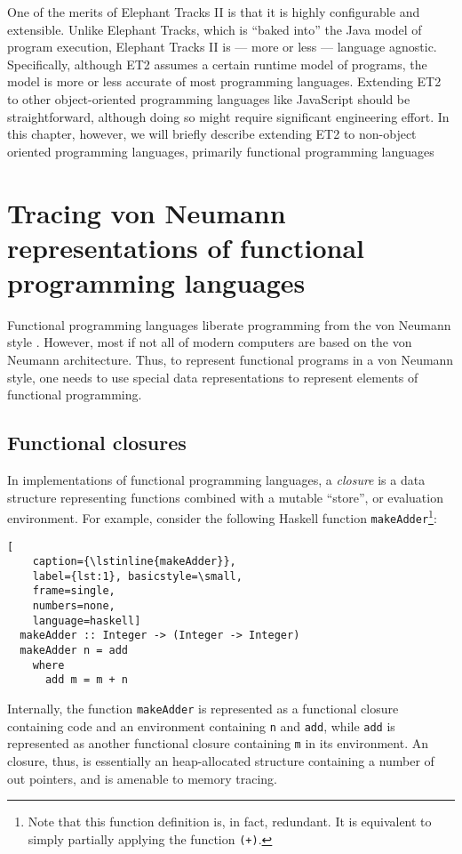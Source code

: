 One of the merits of Elephant Tracks II is that it is highly configurable and extensible. Unlike Elephant Tracks, which is
``baked into'' the Java model of program execution, Elephant Tracks II is --- more or less --- language agnostic. Specifically,
although ET2 assumes a certain runtime model of programs, the model is more or less accurate of most programming languages. Extending
ET2 to other object-oriented programming languages like JavaScript should be straightforward, although doing so might require significant
engineering effort. In this chapter, however, we will briefly describe extending ET2 to non-object oriented programming languages, primarily
functional programming languages

\section{Tracing von Neumann representations of functional programming languages}
Functional programming languages liberate programming from the von Neumann style \citep{LiberateProgramming}. However, most if not all of modern
computers are based on the von Neumann architecture. Thus, to represent functional programs in a von Neumann style, one needs to use special
data representations to represent elements of functional programming.

\subsection{Functional closures}
In implementations of functional programming languages, a \emph{closure} is a data structure representing functions combined with a mutable ``store'',
or evaluation environment. For example, consider the following Haskell function \lstinline{makeAdder}\footnote{Note that this function definition is,
  in fact, redundant. It is equivalent to simply partially applying the function \lstinline{(+)}.}:

\begin{lstlisting}[
    caption={\lstinline{makeAdder}},
    label={lst:1}, basicstyle=\small,
    frame=single,
    numbers=none,
    language=haskell]
  makeAdder :: Integer -> (Integer -> Integer)
  makeAdder n = add
    where
      add m = m + n
\end{lstlisting}

Internally, the function \lstinline{makeAdder} is represented as a functional closure containing code and an environment containing \lstinline{n} and
\lstinline{add}, while \lstinline{add} is represented as another functional closure containing \lstinline{m} in its environment. An closure, thus, is essentially
an heap-allocated structure containing a number of out pointers, and is amenable to memory tracing.

